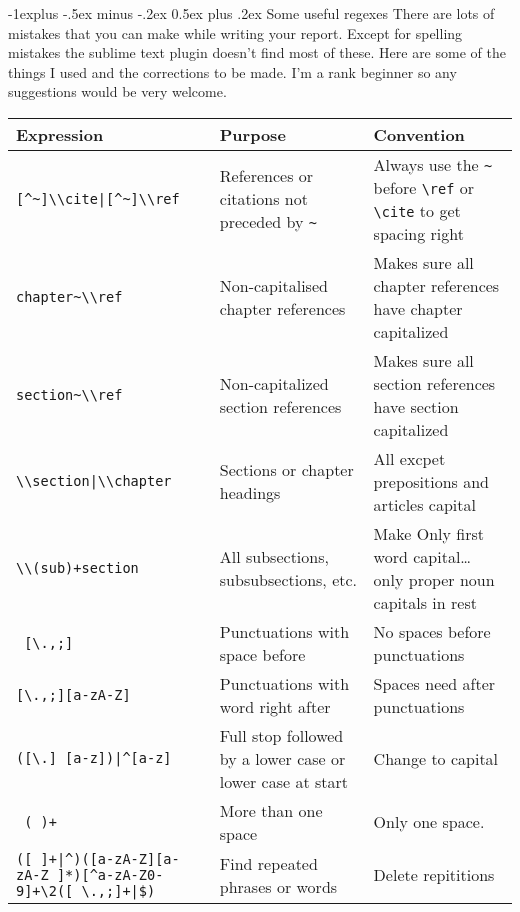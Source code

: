 \documentclass[12pt,landscape]{article}
\makeatletter
\renewcommand{\section}{\@startsection{section}{1}{0mm}%
                                {-1ex plus -.5ex minus -.2ex}%
                                {0.5ex plus .2ex}%
                                {\normalfont\large\bfseries}}
\renewcommand{\subsection}{\@startsection{subsection}{2}{0mm}%
                                {-1explus -.5ex minus -.2ex}%
                                {0.5ex plus .2ex}%
                                {\normalfont\normalsize\bfseries}}
\makeatother
\begin{document}
\subsection{Some useful regexes}
There are lots of mistakes that you can make while writing your report. Except for spelling mistakes the sublime text plugin doesn't find most of these.  Here are some of the things I used and the corrections to be made. I'm a rank beginner so any suggestions would be very welcome.
\\
\vspace{0.25in}
\begin{tabular}{p{4in}  p{2.5in}  p{3in}}
\hline\hline %
Expression                      & Purpose                                       & Convention \\
\hline
\verb![^~]\\cite|[^~]\\ref!       & References or citations not preceded by \verb!~!     & Always use the \verb!~! before \verb!\ref! or \verb!\cite! to get spacing right \\
\verb!chapter~\\ref!       & Non-capitalised chapter references            & Makes sure all chapter references have chapter capitalized \\
\verb!section~\\ref!      & Non-capitalized section references            & Makes sure all section references have section capitalized \\
\verb!\\section|\\chapter!      & Sections or chapter headings                  & All excpet prepositions and articles capital \\
\verb!\\(sub)+section!          & All subsections, subsubsections, etc.         & Make Only first word capital…  only proper noun capitals in rest \\
\verb! [\.,;]!                  & Punctuations with space before                & No spaces before punctuations \\
\verb![\.,;][a-zA-Z]!           & Punctuations with word right after            & Spaces need after punctuations \\
\verb!([\.] [a-z])|^[a-z]!      & Full stop followed by a lower case or lower case at start & Change to capital \\
\verb! ( )+!                    & More than one space                           & Only one space. \\
\verb!([ ]+|^)([a-zA-Z][a-zA-Z ]*)[^a-zA-Z0-9]+\2([ \.,;]+|$)! & Find repeated phrases or words & Delete repititions
\end{tabular}
\vspace{0.25in}
\end{document}
